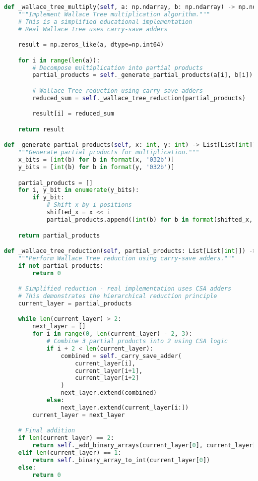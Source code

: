 \begin{lstlisting}[language=Python, caption=Wallace Tree multiplication]
def _wallace_tree_multiply(self, a: np.ndarray, b: np.ndarray) -> np.ndarray:
    """Implement Wallace Tree multiplication algorithm."""
    # This is a simplified educational implementation
    # Real Wallace Tree uses carry-save adders

    result = np.zeros_like(a, dtype=np.int64)

    for i in range(len(a)):
        # Decompose multiplication into partial products
        partial_products = self._generate_partial_products(a[i], b[i])

        # Wallace Tree reduction using carry-save adders
        reduced_sum = self._wallace_tree_reduction(partial_products)

        result[i] = reduced_sum

    return result

def _generate_partial_products(self, x: int, y: int) -> List[List[int]]:
    """Generate partial products for multiplication."""
    x_bits = [int(b) for b in format(x, '032b')]
    y_bits = [int(b) for b in format(y, '032b')]

    partial_products = []
    for i, y_bit in enumerate(y_bits):
        if y_bit:
            # Shift x by i positions
            shifted_x = x << i
            partial_products.append([int(b) for b in format(shifted_x, '064b')])

    return partial_products

def _wallace_tree_reduction(self, partial_products: List[List[int]]) -> int:
    """Perform Wallace Tree reduction using carry-save adders."""
    if not partial_products:
        return 0

    # Simplified reduction - real implementation uses CSA adders
    # This demonstrates the hierarchical reduction principle
    current_layer = partial_products

    while len(current_layer) > 2:
        next_layer = []
        for i in range(0, len(current_layer) - 2, 3):
            # Combine 3 partial products into 2 using CSA logic
            if i + 2 < len(current_layer):
                combined = self._carry_save_adder(
                    current_layer[i],
                    current_layer[i+1],
                    current_layer[i+2]
                )
                next_layer.extend(combined)
            else:
                next_layer.extend(current_layer[i:])
        current_layer = next_layer

    # Final addition
    if len(current_layer) == 2:
        return self._add_binary_arrays(current_layer[0], current_layer[1])
    elif len(current_layer) == 1:
        return self._binary_array_to_int(current_layer[0])
    else:
        return 0
\end{lstlisting}

